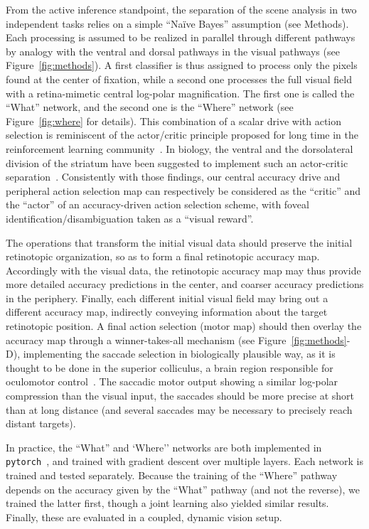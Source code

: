 From the active inference standpoint, the separation of the scene analysis in two independent tasks relies on a simple ``Naïve Bayes'' assumption (see Methods).
Each processing is assumed to be realized in parallel through different pathways by analogy with the ventral and dorsal pathways in the visual pathways (see Figure~\ref{fig:methods}). A first classifier is thus assigned to process only the pixels found at the center of fixation, while a second one processes the full visual field with a retina-mimetic central log-polar magnification. The first one is called the ``What'' network, and the second one is the ``Where'' network (see Figure~\ref{fig:where} for details). This combination of a scalar drive with action selection is reminiscent of the actor/critic principle proposed for long time in the reinforcement learning community~\cite{sutton1998reinforcement}. In biology, the ventral and the dorsolateral division of the striatum have been suggested to implement such an actor-critic separation~\cite{joel2002actor, takahashi2008silencing}. Consistently with those findings, our central accuracy drive and peripheral action selection map can respectively be considered as the ``critic'' and the ``actor'' of an accuracy-driven action selection scheme, with foveal identification/disambiguation taken as a ``visual reward''.

The operations that transform the initial visual data should preserve the initial retinotopic organization, so as to form a final retinotopic accuracy map. Accordingly with the visual data, the retinotopic accuracy map may thus provide more detailed accuracy predictions in the center, and coarser accuracy predictions in the periphery. Finally, each different initial visual field may bring out a different accuracy map, indirectly conveying information about the target retinotopic position. A final action selection (motor map) should then overlay the accuracy map through a winner-takes-all mechanism (see Figure~\ref{fig:methods}-D), implementing the saccade selection in biologically plausible way, as it is thought to be done in the superior colliculus, a brain region responsible for oculomotor control~\cite{sparks1987sensory}. The saccadic motor output showing a similar log-polar compression than the visual input, the saccades should be more precise at short than at long distance (and several saccades may be necessary to precisely reach distant targets). %

In practice, the ``What'' and `Where'' networks are both implemented in \texttt{pytorch}~\cite{NEURIPS2019_9015}, and trained with gradient descent over multiple layers. %
Each network is trained and tested separately. Because the training of the ``Where'' pathway depends on the accuracy given by the ``What'' pathway (and not the reverse), we trained the latter first, though a joint learning also yielded similar results. %
Finally, these are evaluated in a coupled, dynamic vision setup.

